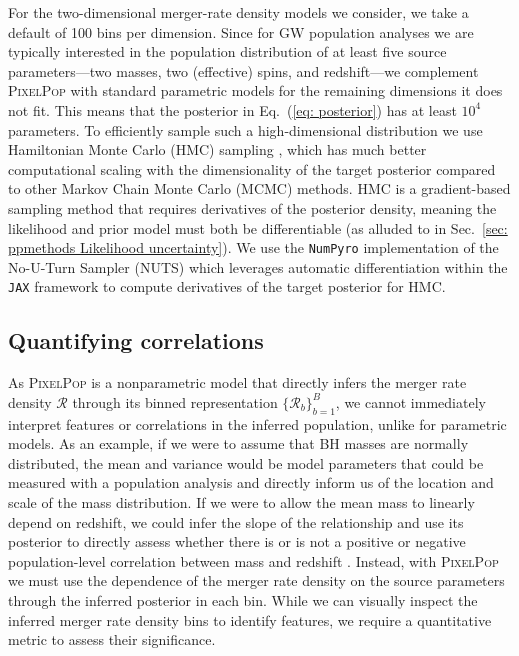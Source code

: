 \begin{refsection}
For the two-dimensional merger-rate density models we consider, we take a default of 100 bins per dimension. Since for GW population analyses we are typically interested in the population distribution of at least five source parameters---two masses, two (effective) spins, and redshift---we complement \textsc{PixelPop} with standard parametric models for the remaining dimensions it does not fit. This means that the posterior in Eq.~(\ref{eq: posterior}) has at least $10^4$ parameters. To efficiently sample such a high-dimensional distribution we use Hamiltonian Monte Carlo (HMC) sampling \cite{Duane:1987de, Neal:2011mrf, Betancourt:2017ebh}, which has much better computational scaling with the dimensionality of the target posterior compared to other Markov Chain Monte Carlo (MCMC) methods. HMC is a gradient-based sampling method that requires derivatives of the posterior density, meaning the likelihood and prior model must both be differentiable (as alluded to in Sec.~\ref{sec: ppmethods Likelihood uncertainty}). We use the \texttt{NumPyro} \cite{Phan:2019elc} implementation of the No-U-Turn Sampler (NUTS) \cite{Hoffman:2011ukg} which leverages automatic differentiation within the \texttt{JAX} framework \cite{jax2018github} to compute derivatives of the target posterior for HMC.

\subsection{Quantifying correlations}
\label{sec: ppmethods spearman}

As \textsc{PixelPop} is a nonparametric model that directly infers the merger rate density $\mathcal{R}$ through its binned representation $\{\mathcal{R}_b\}_{b=1}^B$, we cannot immediately interpret features or correlations in the inferred population, unlike for parametric models. As an example, if we were to assume that BH masses are normally distributed, the mean and variance would be model parameters that could be measured with a population analysis and directly inform us of the location and scale of the mass distribution. If we were to allow the mean mass to linearly depend on redshift, we could infer the slope of the relationship and use its posterior to directly assess whether there is or is not a positive or negative population-level correlation between mass and redshift \cite{Callister:2021fpo, Biscoveanu:2022qac, Safarzadeh:2020mlb}. Instead, with \textsc{PixelPop} we must use the dependence of the merger rate density on the source parameters through the inferred posterior in each bin. While we can visually inspect the inferred merger rate density bins to identify features, we require a quantitative metric to assess their significance.


\end{refsection}
